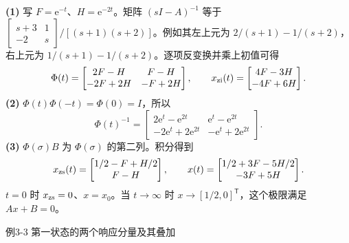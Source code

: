 
\sol \textbf{(1)} 写 $F=\mathrm e^{-t}$、$H=\mathrm e^{-2t}$。矩阵 $(sI-A)^{-1}$ 等于 $\begin{bmatrix}s+3&1\\-2&s\end{bmatrix}/[(s+1)(s+2)]$。例如其左上元为 $2/(s+1)-1/(s+2)$，右上元为 $1/(s+1)-1/(s+2)$。逐项反变换并乘上初值可得
\[
\Phi(t)=\begin{bmatrix}2F-H&F-H\\-2F+2H&-F+2H\end{bmatrix},
\qquad x_{\rm zi}(t)=\begin{bmatrix}4F-3H\\-4F+6H\end{bmatrix}.
\]
\textbf{(2)} $\Phi(t)\Phi(-t)=\Phi(0)=I$，所以
\[
\Phi(t)^{-1}=\begin{bmatrix}
2\mathrm e^t-\mathrm e^{2t}&\mathrm e^t-\mathrm e^{2t}\\
-2\mathrm e^t+2\mathrm e^{2t}&-\mathrm e^t+2\mathrm e^{2t}
\end{bmatrix}.
\]
\textbf{(3)} $\Phi(\sigma)B$ 为 $\Phi(\sigma)$ 的第二列。积分得到
\[
x_{\rm zs}(t)=\begin{bmatrix}1/2-F+H/2\\F-H\end{bmatrix},\qquad
x(t)=\begin{bmatrix}1/2+3F-5H/2\\-3F+5H\end{bmatrix}.
\]
$t=0$ 时 $x_{\rm zs}=0$、$x=x_0$。当 $t\to\infty$ 时 $x\to[1/2,0]^{\mathsf T}$，这个极限满足 $Ax+B=0$。

\begin{center}

\small 例3-3 第一状态的两个响应分量及其叠加
\end{center}


